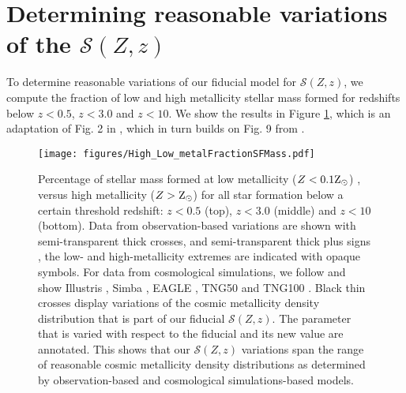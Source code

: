 \documentclass[linenumbers,twocolumn]{aastex631}
\newcommand{\SFRDzZ}{\ensuremath{\mathcal{S}(Z,z)}\xspace}
\begin{document}
\section{Determining reasonable variations of the \SFRDzZ \label{app: reasonable var}}
To determine reasonable variations of our fiducial model for \SFRDzZ, we compute the fraction of low and high metallicity stellar mass formed for redshifts below $z<0.5$, $z < 3.0$ and $z<10$. We show the results in Figure \ref{fig: low high Z fraction}, which is an adaptation of Fig. 2 in \cite{Pakmor+2022}, which in turn builds on Fig. 9 from \cite{Chruslinska2019_obs}.

\begin{figure}
\centering
{}
\texttt{[image: figures/High\_Low\_metalFractionSFMass.pdf]}
\caption{Percentage of stellar mass formed at low metallicity ($Z < 0.1 \rm{Z_{\odot}}$) , versus high metallicity ($Z>\rm{Z_{\odot}}$) for all star formation below a certain threshold redshift: $z<0.5$ (top), $z < 3.0$ (middle) and $z<10$ (bottom). Data from observation-based variations are shown with semi-transparent thick crosses,  \citep[][]{Chruslinska2019_obs} and semi-transparent thick plus signs \citep[][]{Chruslinska+2021}, the low- and high-metallicity extremes are indicated with opaque symbols. For data from cosmological simulations, we follow \cite{Pakmor+2022} and show Illustris \citep[][squares]{Vogelsberger+2014}, Simba \citep[][diamonds]{Dave+2019}, EAGLE \citep[][triangles]{Schaye+2015}, TNG50 and TNG100 \citep[][filled and open circles respectively]{FirstResTNG_Springel2018}. Black thin crosses display variations of the cosmic metallicity density distribution that is part of our fiducial \SFRDzZ. The parameter that is varied with respect to the fiducial and its new value are annotated. This shows that our \SFRDzZ variations span the range of reasonable cosmic metallicity density distributions as determined by observation-based and cosmological simulations-based models.
\label{fig: low high Z fraction}
  }
\end{figure}




  


\clearpage

\end{document}
